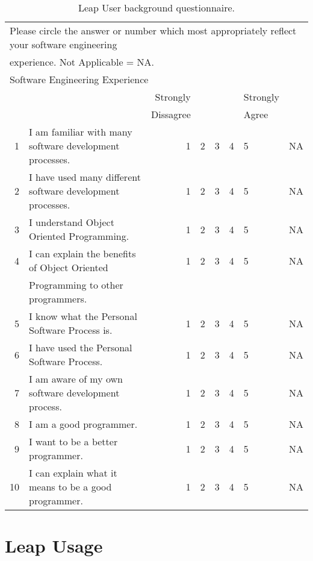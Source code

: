 \begin{table}[htbp]
  \caption{Leap User background questionnaire.}  
  \begin{tabular}{rlrccclc}\\
    \multicolumn{8}{l}{Please circle the answer or number which most appropriately reflect your software engineering} \\
    \multicolumn{8}{l}{experience. Not Applicable = NA.} \\ \hline
    \multicolumn{8}{l}{Software Engineering Experience}\\ \hline
    &&Strongly&&&&Strongly&\\ 
    &&Dissagree&&&&Agree&\\ \hline
    1&I am familiar with many software development processes.&1&2&3&4&5&NA\\ \hline
    2&I have used many different software development processes.&1&2&3&4&5&NA\\ \hline
    3&I understand Object Oriented Programming.&1&2&3&4&5&NA\\ \hline
    4&I can explain the benefits of Object Oriented &1&2&3&4&5&NA\\
    &Programming to other programmers.\\ \hline
    5&I know what the Personal Software Process is.&1&2&3&4&5&NA\\ \hline
    6&I have used the Personal Software Process.&1&2&3&4&5&NA\\ \hline
    7&I am aware of my own software development process.&1&2&3&4&5&NA\\ \hline
    8&I am a good programmer.&1&2&3&4&5&NA\\ \hline
    9&I want to be a better programmer.&1&2&3&4&5&NA\\ \hline
    10&I can explain what it means to be a good programmer.&1&2&3&4&5&NA\\
    \hline
  \end{tabular}
\end{table}

\section*{Leap Usage}


